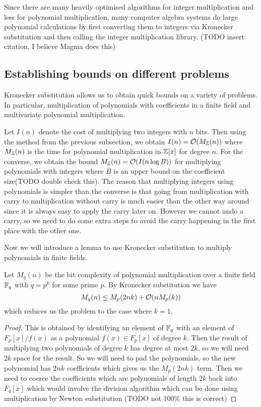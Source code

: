 Since there are many heavily optimised algorithms for integer multiplication and less for polynomial multiplication, many computer algebra systems do large polynomial calculations by first converting them to integers via Kronecker substitution and then calling the integer multiplication library. (TODO insert citation, I believe Magma does this)

\subsection{Establishing bounds on different problems}%
\label{sub:Establishing bounds on different problems}

Kronecker substitution allows us to obtain quick bounds on a variety of problems. In particular, multiplication of polynomials with coefficients in a finite field and multivariate polynomial multiplication.

Let $I(n)$ denote the cost of multiplying two integers with $n$ bits. Then using the method from the previous subsection, we obtain $I(n) = \mathcal O(M_{\mathbb Z}(n))$ where $M_{\mathbb Z}(n)$ is the time for polynomial multiplication in ${\mathbb Z}[x]$ for degree $n$. For the converse, we obtain the bound $M_{\mathbb Z}(n) = \mathcal O(I(n\log B))$ for multiplying polynomials with integers where $B$ is an upper bound on the coefficient size(TODO double check this). The reason that multiplying integers using polynomials is simpler than the converse is that going from multiplication with carry to multiplication without carry is much easier than the other way around since it is always easy to apply the carry later on. However we cannot undo a carry, so we need to do some extra steps to avoid the carry happening in the first place with the other one.

Now we will introduce a lemma to use Kronecker substitution to multiply polynomials in finite fields.

\begin{lemma}
    Let $M_q(n)$ be the bit complexity of polynomial multiplication over a finite field ${\mathbb F}_q$ with $q = p^k$ for some prime $p$. By Kronecker substitution we have
    \[
        M_q(n) \leq M_p(2nk) + \mathcal O(n M_p(k))
    \]
    which reduces us the problem to the case where $k = 1$.
\end{lemma}

\begin{proof}
    This is obtained by identifying an element of ${\mathbb F}_q$ with an element of $F_p[x]/f(x)$ as a polynomial $f(x) \in F_p[x]$ of degree $k$. Then the result of multiplying two polynomials of degree $k$ has degree at most $2k$, so we will need $2k$ space for the result. So we will need to pad the polynomials, so the new polynomial has $2nk$ coefficients which gives us the $M_p(2nk)$ term. Then we need to coerce the coefficients which are polynomials of length $2k$ back into $F_q[x]$ which would involve the division algorithm which can be done using multiplication by Newton substitution (TODO not 100\% this is correct)

\end{proof}

